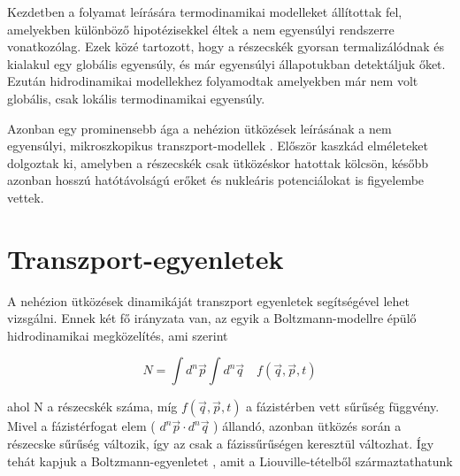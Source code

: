 \documentclass[a4paper,12pt]{article}
\begin{document}
\vspace{5mm}

\par Kezdetben a folyamat leírására termodinamikai modelleket állítottak fel, amelyekben különböző hipotézisekkel éltek a nem egyensúlyi rendszerre vonatkozólag. Ezek közé tartozott, hogy a részecskék gyorsan termalizálódnak és kialakul egy globális egyensúly, és már egyensúlyi állapotukban detektáljuk őket. Ezután hidrodinamikai modellekhez folyamodtak amelyekben már nem volt globális, csak lokális termodinamikai egyensúly.

\vspace{5mm}

\par Azonban egy prominensebb ága a nehézion ütközések leírásának a nem egyensúlyi, mikroszkopikus transzport-modellek \cite{trs}. Először kaszkád elméleteket dolgoztak ki, amelyben a részecskék csak ütközéskor hatottak kölcsön, később azonban hosszú hatótávolságú erőket és nukleáris potenciálokat is figyelembe vettek.

\vspace{5mm}

\section{Transzport-egyenletek}

\par A nehézion ütközések dinamikáját transzport egyenletek segítségével lehet vizsgálni. Ennek két fő irányzata van, az egyik a Boltzmann-modellre épülő hidrodinamikai megközelítés, ami szerint 

\vspace{5mm}

\begin{equation}
	N = \int d^{n}\vec{p} \int d^{n}\vec{q} \quad f(\vec{q}, \vec{p}, t)
\end{equation}

\vspace{5mm}

ahol N a részecskék száma, míg $f(\vec{q}, \vec{p}, t)$ a fázistérben vett sűrűség függvény. Mivel a fázistérfogat elem ( $d^{n}\vec{p}\cdot d^{n}\vec{q}$ ) állandó, azonban ütközés során a részecske sűrűség változik, így az csak a fázissűrűségen keresztül változhat. Így tehát kapjuk a Boltzmann-egyenletet \cite{wolfDSC, buuEq}, amit a Liouville-tételből származtathatunk

\vspace{5mm}
\end{document}

